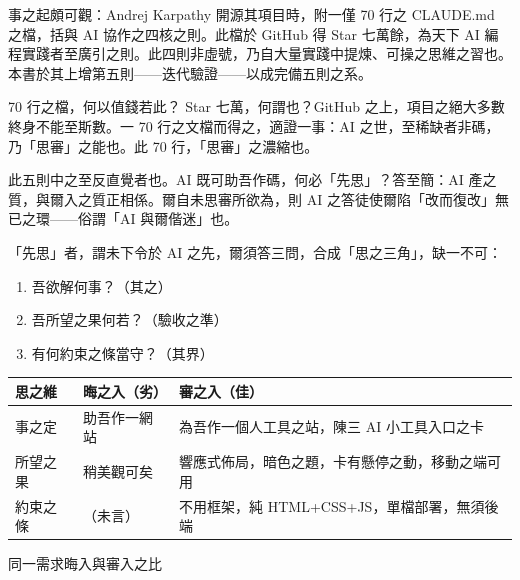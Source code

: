

事之起頗可觀：Andrej Karpathy 開源其項目時，附一僅 70 行之 CLAUDE.md 之檔，括與 AI 協作之四核之則。此檔於 GitHub 得 Star 七萬餘，為天下 AI 編程實踐者至廣引之則。此四則非虛號，乃自大量實踐中提煉、可操之思維之習也。本書於其上增第五則——迭代驗證——以成完備五則之系。

\begin{tcbinfo}{70 行之檔，何以值錢若此？}
Star 七萬，何謂也？GitHub 之上，項目之絕大多數終身不能至斯數。一 70 行之文檔而得之，適證一事：AI 之世，至稀缺者非碼，乃「思審」之能也。此 70 行，「思審」之濃縮也。

\end{tcbinfo}


此五則中之至反直覺者也。AI 既可助吾作碼，何必「先思」？答至簡：AI 產之質，與爾入之質正相係。爾自未思審所欲為，則 AI 之答徒使爾陷「改而復改」無已之環——俗謂「AI 與爾偕迷」也。

「先思」者，謂未下令於 AI 之先，爾須答三問，合成「思之三角」，缺一不可：

\begin{enumerate}
  \item 吾欲解何事？（其之）
  \item 吾所望之果何若？（驗收之準）
  \item 有何約束之條當守？（其界）
\end{enumerate}

\begin{center}
\begin{tabularx}{\linewidth}{|X|X|X|}
\hline
\textbf{思之維} & \textbf{晦之入（劣）} & \textbf{審之入（佳）} \tabularnewline
\hline
事之定 & 助吾作一網站 & 為吾作一個人工具之站，陳三 AI 小工具入口之卡 \tabularnewline
所望之果 & 稍美觀可矣 & 響應式佈局，暗色之題，卡有懸停之動，移動之端可用 \tabularnewline
約束之條 & （未言） & 不用框架，純 HTML+CSS+JS，單檔部署，無須後端 \tabularnewline
\hline
\end{tabularx}
\end{center}

\begin{center}\small\color{gray}同一需求晦入與審入之比\end{center}

